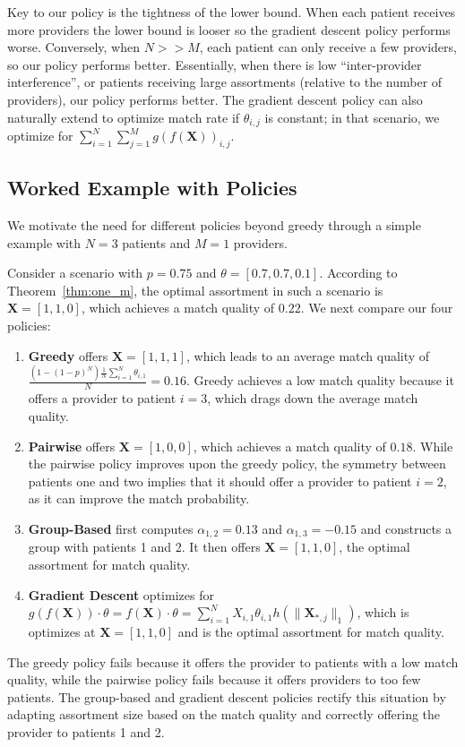 Key to our policy is the tightness of the lower bound. 
When each patient receives more providers the lower bound is looser so the gradient descent policy performs worse. 
Conversely, when $N>>M$, each patient can only receive a few providers, so our policy performs better. 
Essentially, when there is low ``inter-provider interference'', or patients receiving large assortments (relative to the number of providers), our policy performs better. 
The gradient descent policy can also naturally extend to optimize match rate if $\theta_{i,j}$ is constant; in that scenario, we optimize for $\sum_{i=1}^{N} \sum_{j=1}^{M} g(f(\mathbf{X}))_{i,j}$. 

\subsection{Worked Example with Policies}
\label{sec:example_policies}
We motivate the need for different policies beyond greedy through a simple example with $N=3$ patients and $M=1$ providers.
\begin{example}
    Consider a scenario with $p=0.75$ and $\theta = [0.7,0.7,0.1]$. 
    According to Theorem~\ref{thm:one_m}, the optimal assortment in such a scenario is $\mathbf{X} = [1,1,0]$, which achieves a match quality of $0.22$. 
    We next compare our four policies: 
    \begin{enumerate}
        \item \textbf{Greedy} offers $\mathbf{X} = [1,1,1]$, which leads to an average match quality of $\frac{(1-(1-p)^{N}) \frac{1}{N} \sum_{i=1}^{N} \theta_{i,1}}{N} = 0.16$. Greedy achieves a low match quality because it offers a provider to patient $i=3$, which drags down the average match quality.
        \item \textbf{Pairwise} offers $\mathbf{X} = [1,0,0]$, which achieves a match quality of $0.18$. While the pairwise policy improves upon the greedy policy, the symmetry between patients one and two implies that it should offer a provider to patient $i=2$, as it can improve the match probability. 
        \item \textbf{Group-Based} first computes $\alpha_{1,2} = 0.13$ and $\alpha_{1,3} = -0.15$ and constructs a group with patients 1 and 2. It then offers $\mathbf{X} = [1,1,0]$, the optimal assortment for match quality. 
        \item \textbf{Gradient Descent} optimizes for $g(f(\mathbf{X})) \cdot \theta = f(\mathbf{X}) \cdot \theta = \sum_{i=1}^{N} X_{i,1} \theta_{i,1} h(\lVert \mathbf{X}_{*,j} \rVert_{1})$, which is optimizes at $\mathbf{X} = [1,1,0]$ and is the optimal assortment for match quality.  
    \end{enumerate}
\end{example}
The greedy policy fails because it offers the provider to patients with a low match quality, while the pairwise policy fails because it offers providers to too few patients. 
The group-based and gradient descent policies rectify this situation by adapting assortment size based on the match quality and correctly offering the provider to patients 1 and 2. 